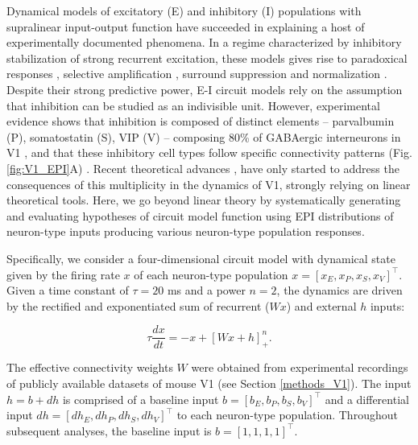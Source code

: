 \documentclass[11pt]{article}
\begin{document}
Dynamical models of excitatory (E) and inhibitory (I) populations with supralinear input-output function have succeeded in explaining a host of experimentally documented phenomena.
In a regime characterized by inhibitory stabilization of strong recurrent excitation, these models gives rise to paradoxical responses \cite{tsodyks1997paradoxical}, selective amplification  \cite{murphy2009balanced}, surround suppression \cite{ozeki2009inhibitory} and normalization \cite{rubin2015stabilized}. 
Despite their strong predictive power, E-I circuit models rely on the assumption that inhibition can be studied as an indivisible unit. 
However, experimental evidence shows that inhibition is composed of distinct elements -- parvalbumin (P), somatostatin (S), VIP (V) --
composing 80\% of GABAergic interneurons in V1 \cite{markram2004interneurons, rudy2011three, tremblay2016}, and that these inhibitory cell types follow specific connectivity patterns (Fig. \ref{fig:V1_EPI}A) \cite{pfeffer2013inhibition}.
Recent theoretical advances \cite{litwin2016inhibitory, GarciaDelMolino2017, Chen2019},  have only started to address the consequences of this multiplicity in the dynamics of V1, strongly relying on linear theoretical tools. 
Here, we go beyond linear theory by systematically generating and evaluating hypotheses of circuit model function using EPI distributions of neuron-type inputs producing various neuron-type population responses.

Specifically, we consider a four-dimensional circuit model with dynamical state given by the firing rate $x$ of each neuron-type population $x = \left[x_E, x_P , x_S, x_V \right]^\top$. Given a time constant of $\tau = 20$ ms and a power $n = 2$, the dynamics are driven by the rectified and exponentiated sum of recurrent ($Wx$) and external $h$ inputs:

\begin{equation}
\tau \frac{dx}{dt} = -x + [W x+ h]_+^n.
\end{equation}

The effective connectivity weights $W$ were obtained from experimental recordings of publicly available datasets of mouse V1 \cite{allen2018layer, billeh2019systematic} (see Section \ref{methods_V1}).
The input $h = b + dh$ is comprised of a baseline input  $b = \left[ b_E, b_P , b_S , b_V \right]^\top$ and a differential input $dh = \left[ dh_E , dh_P , dh_S , dh_V\right]^\top$ to each neuron-type population.  
Throughout subsequent analyses, the baseline input is $b = \left[ 1 ,1,1,1\right]^\top$. 
\end{document}
